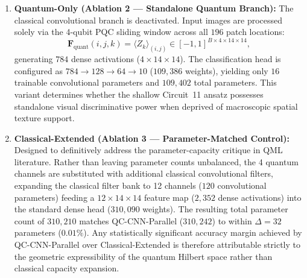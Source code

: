 \documentclass[pdflatex,sn-mathphys-num]{sn-jnl}%
\theoremstyle{thmstyleone}%
\theoremstyle{thmstyletwo}%
\theoremstyle{thmstylethree}%
\begin{document}
\begin{enumerate}
    \item \textbf{Quantum-Only (Ablation 2 --- Standalone Quantum Branch):} The classical convolutional branch is deactivated. Input images are processed solely via the 4-qubit PQC sliding window across all $196$ patch locations:
    \begin{equation}
    \mathbf{F}_{\mathrm{quant}}(i, j, k) = \langle Z_k \rangle_{(i,j)} \in [-1, 1]^{B \times 4 \times 14 \times 14},
    \label{eq:quantum_only_tensor}
    \end{equation}
    generating $784$ dense activations ($4 \times 14 \times 14$). The classification head is configured as $784 \to 128 \to 64 \to 10$ ($109{,}386$ weights), yielding only $16$ trainable convolutional parameters and $109{,}402$ total parameters. This variant determines whether the shallow Circuit~11 ansatz possesses standalone visual discriminative power when deprived of macroscopic spatial texture support.

    \item \textbf{Classical-Extended (Ablation 3 --- Parameter-Matched Control):} Designed to definitively address the parameter-capacity critique in QML literature. Rather than leaving parameter counts unbalanced, the 4 quantum channels are substituted with additional classical convolutional filters, expanding the classical filter bank to 12 channels ($120$ convolutional parameters) feeding a $12 \times 14 \times 14$ feature map ($2{,}352$ dense activations) into the standard dense head ($310{,}090$ weights). The resulting total parameter count of $310{,}210$ matches QC-CNN-Parallel ($310{,}242$) to within $\Delta = 32$ parameters ($0.01\%$). Any statistically significant accuracy margin achieved by QC-CNN-Parallel over Classical-Extended is therefore attributable strictly to the geometric expressibility of the quantum Hilbert space rather than classical capacity expansion.
\end{enumerate}
\end{document}
